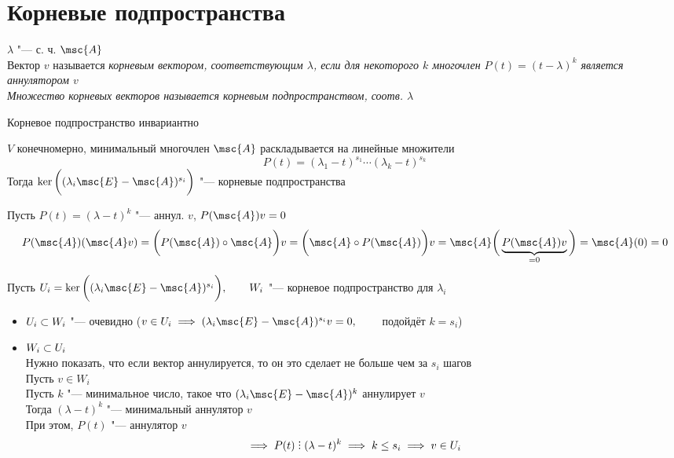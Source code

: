 \section{Корневые подпространства}

\begin{definition}
	$ \lambda $ "--- с. ч. $ \msc{A} $ \\
	Вектор $ v $ называется \it{корневым вектором}, соответствующим $ \lambda $, если для некоторого $ k $ многочлен $ P(t) = (t - \lambda)^k $ является аннулятором $ v $ \\
	Множество корневых векторов называется \it{корневым подпространством}, соотв. $ \lambda $
\end{definition}

\begin{props}
	\item Корневое подпространство инвариантно

	\item $ V $ конечномерно, минимальный многочлен $ \msc{A} $ раскладывается на линейные множители
	$$ P(t) = (\lambda_1 - t)^{s_1} \cdots (\lambda_k - t)^{s_k} $$
	Тогда $ \ker \bigg( (\lambda_i \msc{E} - \msc{A})^{s_i} \bigg) $ "--- корневые подпространства
\end{props}

\begin{eproof}
	\item Пусть $ P(t) = (\lambda - t)^k $ "--- аннул. $ v $, \ie $ P(\msc{A})v = 0 $
	$$ P(\msc{A})(\msc{A}v) = \bigg( P(\msc{A}) \circ \msc{A} \bigg)v = \bigg( \msc{A} \circ P(\msc{A}) \bigg)v = \msc{A} \bigg( \underbrace{P(\msc{A})v}_{= 0} \bigg) = \msc{A}(0) = 0 $$

	\item Пусть $ U_i = \ker \bigg( (\lambda_i \msc{E} - \msc{A})^{s_i} \bigg), \qquad W_i $ "--- корневое подпространство для $ \lambda_i $
	\begin{itemize}
		\item $ U_i \subset W_i $ "--- очевидно ($ v \in U_i \implies (\lambda_i \msc{E} - \msc{A})^{s_i}v = 0, \qquad $ подойдёт $ k = s_i $)
		\item $ W_i \subset U_i $ \\
		Нужно показать, что если вектор аннулируется, то он это сделает не больше чем за $ s_i $ шагов \\
		Пусть $ v \in W_i $ \\
		Пусть $ k $ "--- минимальное число, такое что $ (\lambda_i \msc{E} - \msc{A})^k $ аннулирует $ v $ \\
		Тогда $ (\lambda - t)^k $ "--- минимальный аннулятор $ v $ \\
		При этом, $ P(t) $ "--- аннулятор $ v $
		$$ \implies P(t) \divby (\lambda - t)^k \implies k \le s_i \implies v \in U_i $$
	\end{itemize}
\end{eproof}

